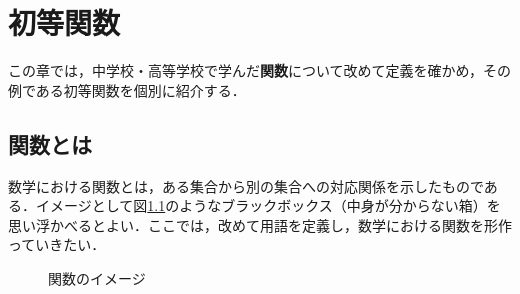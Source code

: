 \chapter{初等関数}
この章では，中学校・高等学校で学んだ\textbf{関数}について改めて定義を確かめ，その例である初等関数を個別に紹介する．

\section{関数とは}
数学における関数とは，ある集合から別の集合への対応関係を示したものである．イメージとして図\ref{fig:blackbox}のようなブラックボックス（中身が分からない箱）を思い浮かべるとよい．ここでは，改めて用語を定義し，数学における関数を形作っていきたい．

\vspace*{4cm}
\begin{figure}[!h]
	\caption{関数のイメージ}
	\label{fig:blackbox}
\end{figure}

